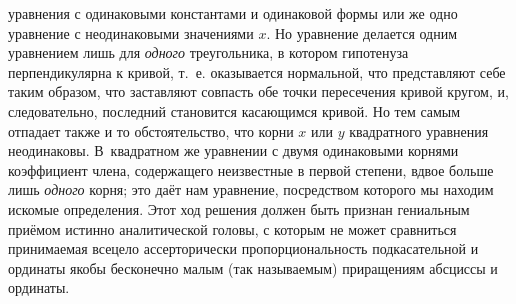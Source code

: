 уравнения с одинаковыми константами и одинаковой формы или же одно уравнение с
неодинаковыми значениями $x$. Но уравнение делается одним уравнением лишь для
{\em одного} треугольника, в котором гипотенуза перпендикулярна к кривой, т.~е.
оказывается нормальной, что представляют себе таким образом, что заставляют
совпасть обе точки пересечения кривой кругом, и, следовательно, последний
становится касающимся кривой. Но тем самым отпадает также и то обстоятельство,
что корни $x$ или $y$ квадратного уравнения неодинаковы. В~квадратном же
уравнении с двумя одинаковыми корнями коэффициент члена, содержащего
неизвестные в первой степени, вдвое больше лишь {\em одного} корня; это даёт
нам уравнение, посредством которого мы находим искомые определения. Этот ход
решения должен быть признан гениальным приёмом истинно аналитической головы, с
которым не может сравниться принимаемая всецело ассерторически
пропорциональность подкасательной и ординаты якобы бесконечно малым (так
называемым) приращениям абсциссы и ординаты.

